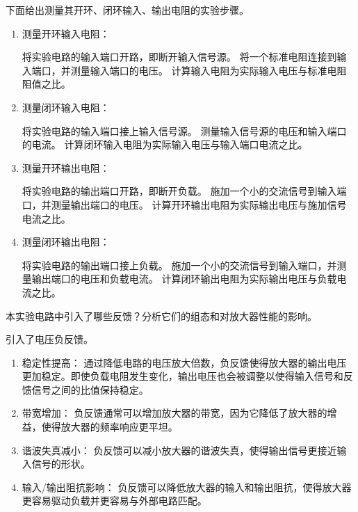 \documentclass[dvipsnames, svgnames,a4paper,11pt]{article}
\begin{document}
		下面给出测量其开环、闭环输入、输出电阻的实验步骤。
		\begin{enumerate}
			\item 测量开环输入电阻：

				将实验电路的输入端口开路，即断开输入信号源。
				将一个标准电阻连接到输入端口，并测量输入端口的电压。
				计算输入电阻为实际输入电压与标准电阻阻值之比。

			\item 测量闭环输入电阻：

				将实验电路的输入端口接上输入信号源。
				测量输入信号源的电压和输入端口的电流。
				计算闭环输入电阻为实际输入电压与输入端口电流之比。

			\item 测量开环输出电阻：

				将实验电路的输出端口开路，即断开负载。
				施加一个小的交流信号到输入端口，并测量输出端口的电压。
				计算开环输出电阻为实际输出电压与施加信号电流之比。

			\item 测量闭环输出电阻：

				将实验电路的输出端口接上负载。
				施加一个小的交流信号到输入端口，并测量输出端口的电压和负载电流。
				计算闭环输出电阻为实际输出电压与负载电流之比。
		\end{enumerate}


		




	\begin{question}
		本实验电路中引入了哪些反馈？分析它们的组态和对放大器性能的影响。
	\end{question}
	
		引入了电压负反馈。

		\begin{enumerate}
			\item 稳定性提高： 通过降低电路的电压放大倍数，负反馈使得放大器的输出电压更加稳定。即使负载电阻发生变化，输出电压也会被调整以使得输入信号和反馈信号之间的比值保持稳定。
			\item 带宽增加： 负反馈通常可以增加放大器的带宽，因为它降低了放大器的增益，使得放大器的频率响应更平坦。
			\item 谐波失真减小： 负反馈可以减小放大器的谐波失真，使得输出信号更接近输入信号的形状。
			\item 输入/输出阻抗影响： 负反馈可以降低放大器的输入和输出阻抗，使得放大器更容易驱动负载并更容易与外部电路匹配。

		\end{enumerate}
	
\end{document}
